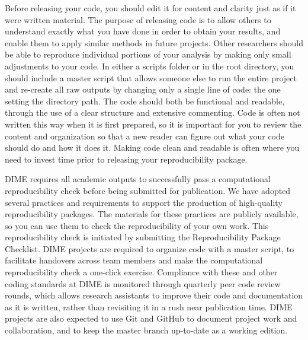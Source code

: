 Before releasing your code, you should edit it for content and clarity
just as if it were written material.
The purpose of releasing code is to allow others to understand
exactly what you have done in order to obtain your results,
and enable them to apply similar methods in future projects.
Other researchers should be able to reproduce individual portions of your analysis
by making only small adjustments to your code.
In either a scripts folder or in the root directory,
you should include a master script that allows someone else to run the entire project
and re-create all raw outputs by changing only a single line of code:
the one setting the directory path.
The code should both be functional and readable,
through the use of a clear structure and extensive commenting.
Code is often not written this way when it is first prepared,
so it is important for you to review the content and organization
so that a new reader can figure out what your code should do and how it does it.
Making code clean and readable is often where you need to invest time prior to releasing your reproducibility package.

DIME requires all academic outputs to successfully pass a computational reproducibility check
before being submitted for publication.
We have adopted several practices and requirements to support the production
of high-quality reproducibility packages.
The materials for these practices are publicly available,
so you can use them to check the reproducibility of your own work.
This reproducibility check is initiated by submitting the Reproducibility Package Checklist.
DIME projects are required to organize code
with a master script, to facilitate handovers across team members
and make the computational reproducibility check a one-click exercise.
Compliance with these and other coding standards at DIME is monitored through
quarterly peer code review rounds, which allows research assistants to improve their code and documentation as it is written,
rather than revisiting it in a rush near publication time.
DIME projects are also expected to use Git and GitHub
to document project work and collaboration,
and to keep the master branch up-to-date as a working edition.

